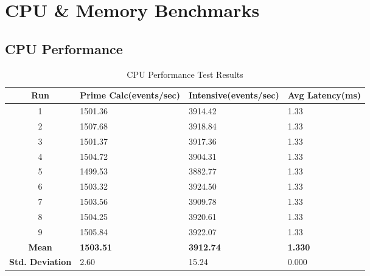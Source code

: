 \section{CPU \& Memory Benchmarks}

\subsection{CPU Performance}
\begin{table}[H]
\centering
\begin{tabular}{|c|p{3cm}|p{3cm}|p{3cm}|}
\hline
\textbf{Run} & \textbf{Prime Calc\newline(events/sec)} & \textbf{Intensive\newline(events/sec)} & \textbf{Avg Latency\newline(ms)} \\
\hline
1 & 1501.36 & 3914.42 & 1.33 \\
2 & 1507.68 & 3918.84 & 1.33 \\
3 & 1501.37 & 3917.36 & 1.33 \\
4 & 1504.72 & 3904.31 & 1.33 \\
5 & 1499.53 & 3882.77 & 1.33 \\
6 & 1503.32 & 3924.50 & 1.33 \\
7 & 1503.56 & 3909.78 & 1.33 \\
8 & 1504.25 & 3920.61 & 1.33 \\
9 & 1505.84 & 3922.07 & 1.33 \\
\hline
\textbf{Mean} & \textbf{1503.51} & \textbf{3912.74} & \textbf{1.330} \\
\textbf{Std. Deviation} & 2.60 & 15.24 & 0.000 \\
\hline
\end{tabular}
\caption{CPU Performance Test Results}
\end{table}

